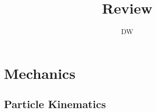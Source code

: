 \documentclass[a4paper,11pt]{article}
\title{Review}
\author{DW}
\begin{document}
\maketitle
\section{Mechanics}
\subsection{Particle Kinematics}
\end{document}
